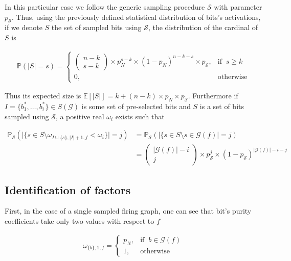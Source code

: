 \documentclass[a4paper, 11pt]{article}
\begin{document}
In this particular case we follow the generic sampling procedure $\mathcal{S}$ with parameter $p_{\mathcal{S}}$. Thus, using the previously defined statistical distribution of bits's activations, if we denote $S$ the set of sampled bits using $\mathcal{S}$, the distribution of the cardinal of $S$ is 

\begin{align*}
\mathbb{P}\left(\vert S \vert = s\right) = \begin{cases} \begin{pmatrix} n - k \\ s - k  \end{pmatrix} \times p_N^{s - k } \times (1 - p_N)^{n-k-s} \times p_{\mathcal{S}} , & \text{if }\ s \geq k \\ 0, & \text{otherwise} \end{cases}
\end{align*}

Thus its expected size is $\mathbb{E}\left[ \vert S \vert \right] = k + (n - k) \times p_N \times p_{\mathcal{S}} $. Furthermore if $I= \{b_1^{*}, \ldots, b_i^{*} \}\in S(\mathcal{G})$ is some set of pre-selected bits and $S$ is a set of bits sampled using $\mathcal{S}$, a positive real $\omega_i$ exists such that

\begin{align*}
\mathbb{P}_{\mathcal{S}} \left( \vert \lbrace s \in S \setminus \omega_{I \cup \{s\}, \vert I \vert + 1, f } < \omega_i \rbrace \vert = j \right)  &= \mathbb{P}_{\mathcal{S}} \left( \vert \lbrace s \in S \setminus s\in \mathcal{G}(f) \vert = j \right)\\
&= \begin{pmatrix} \vert \mathcal{G}(f) \vert -i \\ j  \end{pmatrix} \times p_{\mathcal{S}}^{j} \times (1 - p_{\mathcal{S}})^{\vert \mathcal{G}(f) \vert -i - j}
\end{align*}

\subsection{Identification of factors}

First, in the case of a single sampled firing graph, one can see that bit's purity coefficients take only two values with respect to $f$

\begin{align*}
\omega_{\{b\}, 1, f} = \begin{cases} p_N , & \text{if }\ b \in \mathcal{G}(f) \\ 1, & \text{otherwise} \end{cases}
\end{align*}
\end{document}
